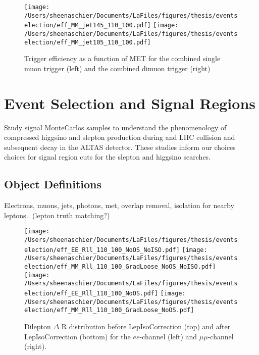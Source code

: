 \documentclass[11pt, oneside]{article}   	%
\begin{document}
   \begin{figure}[tbp]
     \texttt{[image: /Users/sheenaschier/Documents/LaFiles/figures/thesis/eventselection/eff\_MM\_jet145\_110\_100.pdf]}
       \texttt{[image: /Users/sheenaschier/Documents/LaFiles/figures/thesis/eventselection/eff\_MM\_jet105\_110\_100.pdf]}\\
   \caption{Trigger efficiency as a function of MET for the combined single muon trigger (left) and the combined dimuon trigger (right)}
   \label{fig:TrigEff2}
 \end{figure}

\clearpage
\section{Event Selection and Signal Regions}
\label{sec:sr}
Study signal MonteCarlos samples to understand the phenomenology of compressed higgsino and slepton production during and LHC collision and subsequent decay in the ALTAS detector.  These studies inform our choices choices for signal region cuts for the slepton and higgsino searches. 
\subsection{Object Definitions}
\label{sec:objdef}
Electrons, muons, jets, photons, met, overlap removal, isolation for nearby leptons.. (lepton truth matching?)

  \begin{figure}[tbp]
     \texttt{[image: /Users/sheenaschier/Documents/LaFiles/figures/thesis/eventselection/eff\_EE\_Rll\_110\_100\_NoOS\_NoISO.pdf]}
       \texttt{[image: /Users/sheenaschier/Documents/LaFiles/figures/thesis/eventselection/eff\_MM\_Rll\_110\_100\_GradLoose\_NoOS\_NoISO.pdf]}\\
     \texttt{[image: /Users/sheenaschier/Documents/LaFiles/figures/thesis/eventselection/eff\_EE\_Rll\_110\_100\_NoOS.pdf]}
     \texttt{[image: /Users/sheenaschier/Documents/LaFiles/figures/thesis/eventselection/eff\_MM\_Rll\_110\_100\_GradLoose\_NoOS.pdf]}\\
   \caption{Dilepton $\Delta$ R distribution before LepIsoCorrection (top) and after LepIsoCorrection (bottom) for the $ee$-channel (left) and $\mu\mu$-channel (right).}
   \label{fig:EffRll_ISOCorr}
 \end{figure}
\end{document}
